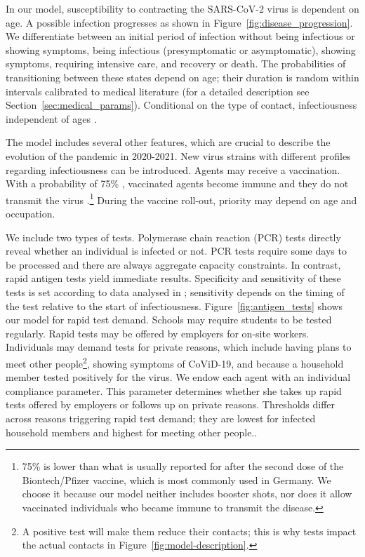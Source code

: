 In our model, susceptibility to contracting the SARS-CoV-2 virus is dependent on age. A
possible infection progresses as shown in Figure~\ref{fig:disease_progression}. We
differentiate between an initial period of infection without being infectious or showing
symptoms, being infectious (presymptomatic or asymptomatic), showing symptoms, requiring
intensive care, and recovery or death. The probabilities of transitioning between these
states depend on age; their duration is random within intervals calibrated to medical
literature (for a detailed description see Section~\ref{sec:medical_params}).
Conditional on the type of contact, infectiousness independent of ages
\citep{Jones2021}.

The model includes several other features, which are crucial to describe the evolution
of the pandemic in 2020-2021. New virus strains with different profiles regarding
infectiousness can be introduced. Agents may receive a vaccination. With a probability
of 75\% \citep{Hunter2021}, vaccinated agents become immune and they do not transmit the
virus \citep{Petter2021, LevineTiefenbrun2021, Pritchard2021}.\footnote{75\% is lower
than what is usually reported for after the second dose of the Biontech/Pfizer vaccine,
which is most commonly used in Germany. We choose it because our model neither includes
booster shots, nor does it allow vaccinated individuals who became immune to transmit
the disease\citep{Petter2021, LevineTiefenbrun2021, Pritchard2021}.} During the vaccine
roll-out, priority may depend on age and occupation.

We include two types of tests. Polymerase chain reaction (PCR) tests directly reveal
whether an individual is infected or not. PCR tests require some days to be processed
and there are always aggregate capacity constraints. In contrast, rapid antigen tests
yield immediate results. Specificity and sensitivity of these tests is set according to
data analysed in \cite{Bruemmer2021, Smith2021}; sensitivity depends on the timing of
the test relative to the start of infectiousness. Figure~\ref{fig:antigen_tests} shows
our model for rapid test demand. Schools may require students to be tested regularly.
Rapid tests may be offered by employers for on-site workers. Individuals may demand
tests for private reasons, which include having plans to meet other people\footnote{A
positive test will make them reduce their contacts; this is why tests impact the actual
contacts in Figure~\ref{fig:model-description}.}, showing symptoms of CoViD-19, and
because a household member tested positively for the virus. We endow each agent with an
individual compliance parameter. This parameter determines whether she takes up rapid
tests offered by employers or follows up on private reasons. Thresholds differ across
reasons triggering rapid test demand; they are lowest for infected household members and
highest for meeting other people..

